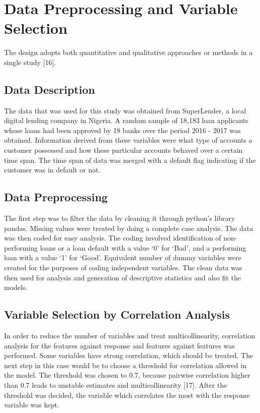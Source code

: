 \documentclass[a4paper]{article}
\begin{document}
\section{Data Preprocessing and Variable Selection}
The design adopts both quantitative and qualitative approaches or methods in a single study [16]. 

\subsection{Data Description}
The data that was used for this study was obtained from SuperLender, a local digital lending company in Nigeria. A random sample of 18,183 loan applicants whose loans had been approved by 18 banks over the period 2016 - 2017 was obtained. Information derived from these variables were what type of accounts a customer possessed and how these particular accounts behaved over a certain time span. The time span of data was merged with a default flag indicating if the customer was in default or not.

\subsection{Data Preprocessing}
The first step was to filter the data by cleaning it through python’s library pandas. Missing values were treated by doing a complete case analysis. The data was then coded for easy analysis. The coding involved identification of non-performing loans or a loan default with a value ‘0’ for ‘Bad’, and a performing loan with a value ‘1’ for ‘Good’. Equivalent number of dummy variables were created for the purposes of coding independent variables. The clean data was then used for analysis and generation of descriptive statistics and also fit the models.

\subsection{Variable Selection by Correlation Analysis}
In order to reduce the number of variables and treat multicollinearity, correlation analysis for the features against response and features against features was performed. Some variables have strong correlation, which should be treated. The next step in this case would be to choose a threshold for correlation allowed in the model. The threshold was chosen to 0.7, because pairwise correlation higher than 0.7 leads to unstable estimates and multicollinearity [17]. After the threshold was decided, the variable which correlates the most with the response variable was kept.
\end{document}
